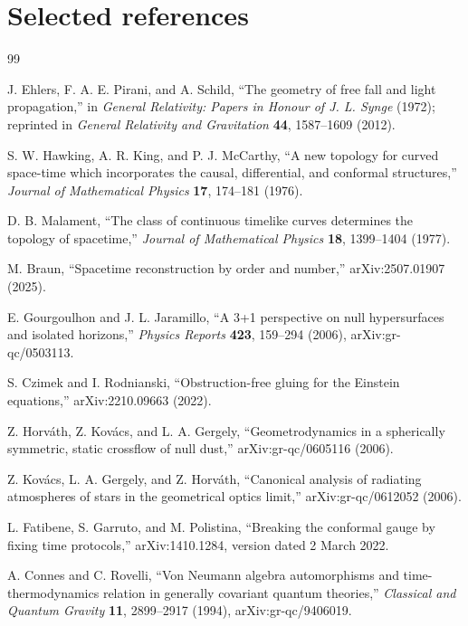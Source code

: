 \documentclass[11pt,a4paper]{article}
\begin{document}
\section{Selected references}

\begin{thebibliography}{99}

J. Ehlers, F. A. E. Pirani, and A. Schild,
``The geometry of free fall and light propagation,''
in \emph{General Relativity: Papers in Honour of J. L. Synge} (1972); reprinted in \emph{General Relativity and Gravitation} \textbf{44}, 1587--1609 (2012).

S. W. Hawking, A. R. King, and P. J. McCarthy,
``A new topology for curved space-time which incorporates the causal, differential, and conformal structures,''
\emph{Journal of Mathematical Physics} \textbf{17}, 174--181 (1976).

D. B. Malament,
``The class of continuous timelike curves determines the topology of spacetime,''
\emph{Journal of Mathematical Physics} \textbf{18}, 1399--1404 (1977).

M. Braun,
``Spacetime reconstruction by order and number,'' arXiv:2507.01907 (2025).

E. Gourgoulhon and J. L. Jaramillo,
``A 3+1 perspective on null hypersurfaces and isolated horizons,''
\emph{Physics Reports} \textbf{423}, 159--294 (2006), arXiv:gr-qc/0503113.

S. Czimek and I. Rodnianski,
``Obstruction-free gluing for the Einstein equations,'' arXiv:2210.09663 (2022).

Z. Horv\'ath, Z. Kov\'acs, and L. A. Gergely,
``Geometrodynamics in a spherically symmetric, static crossflow of null dust,'' arXiv:gr-qc/0605116 (2006).

Z. Kov\'acs, L. A. Gergely, and Z. Horv\'ath,
``Canonical analysis of radiating atmospheres of stars in the geometrical optics limit,'' arXiv:gr-qc/0612052 (2006).

L. Fatibene, S. Garruto, and M. Polistina,
``Breaking the conformal gauge by fixing time protocols,'' arXiv:1410.1284, version dated 2 March 2022.

A. Connes and C. Rovelli,
``Von Neumann algebra automorphisms and time-thermodynamics relation in generally covariant quantum theories,''
\emph{Classical and Quantum Gravity} \textbf{11}, 2899--2917 (1994), arXiv:gr-qc/9406019.


\end{thebibliography}
\end{document}

